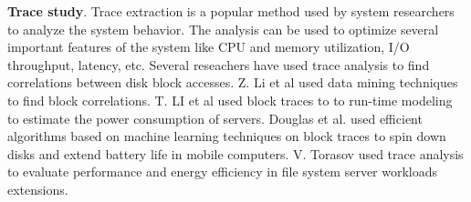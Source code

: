 \textbf{Trace study}. Trace extraction is a popular method used by
system researchers to analyze the system behavior. The analysis can be
used to optimize several important features of the system like CPU and
memory utilization, I/O throughput, latency, etc. Several reseachers
have used trace analysis to find correlations between disk block
accesses. Z. Li et al \cite{Li04c-miner} used data mining techniques
to find block correlations. T. LI et al \cite{Li_model} used block
traces to to run-time modeling to estimate the power consumption of
servers. Douglas et al. \cite{Douglis_95} used efficient algorithms
based on machine learning techniques on block traces to spin down
disks and extend battery life in mobile computers. V. Torasov
\cite{fast12t2m} used trace analysis to evaluate performance and
energy efficiency in file system server workloads extensions.


